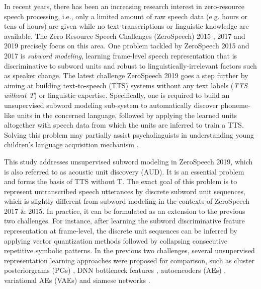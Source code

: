 \documentclass[a4paper]{article}
\begin{document}
In recent years, there has been an increasing research interest in zero-resource speech processing, i.e., only a limited amount of  raw speech data (e.g. hours or tens of hours)  are given while no text transcriptions or linguistic knowledge are available. The Zero Resource Speech Challenges (ZeroSpeech)   2015 \cite{versteegh2015zero}, 2017 \cite{dunbar2017zero} and 2019 \cite{dunbar2019zero} precisely focus on this area. One problem tackled by ZeroSpeech 2015 and 2017 is \textit{subword modeling}, learning frame-level speech representation that is discriminative to subword units and robust to linguistically-irrelevant factors such as speaker change. The latest challenge ZeroSpeech 2019 goes a step further by aiming at building text-to-speech (TTS) systems without any text labels (\textit{TTS without T}) or linguistic expertise. Specifically,  one is required to build an unsupervised subword modeling sub-system to automatically discover phoneme-like units in the concerned language, followed by applying the learned units altogether with speech data from which the units are inferred to train a TTS. Solving this problem may partially assist psycholinguists in understanding young children's language acquisition mechanism \cite{dunbar2019zero}.


This study addresses unsupervised subword modeling  in ZeroSpeech 2019, which is also referred to as acoustic unit discovery (AUD).
It is an essential problem and forms the basis of TTS without T.
The exact goal of this problem  is to represent  untranscribed speech utterances by discrete subword unit sequences, which is slightly different from subword modeling in the contexts of ZeroSpeech 2017 \& 2015.
In practice, it can be formulated as an extension to  the previous two challenges. For instance, after learning the subword discriminative feature representation at frame-level, the discrete unit sequences can be inferred by applying vector quantization methods  followed by collapsing  consecutive repetitive symbolic patterns. 
In the previous two challenges,  several unsupervised representation learning approaches were proposed for comparison, such as cluster posteriorgrams (PGs) \cite{chen2015parallel,ansari2017unsupervised,heck2017feature}, DNN bottleneck features \cite{shibata2017composite,chen2017multilingual}, autoencoders (AEs) \cite{renshaw2015comparison,kamper2015unsupervised}, variational AEs (VAEs) \cite{Feng2019improving_arxiv,Chorowski2019unsup} and siamese networks \cite{thiolliere2015hybrid,Zeghidour+2016,Riad2018}.
\end{document}
